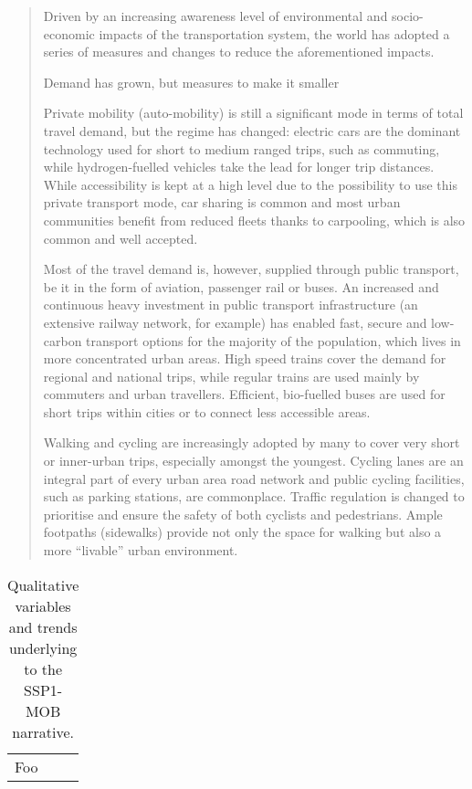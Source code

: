 \blockquote{Driven by an increasing awareness level of environmental and socio-economic impacts of the transportation system, the world has adopted a series of measures and changes to reduce the aforementioned impacts.

Demand has grown, but measures to make it smaller

Private mobility (auto-mobility) is still a significant mode in terms of total travel demand, but the regime has changed: electric cars are the dominant technology used for short to medium ranged trips, such as commuting, while hydrogen-fuelled vehicles take the lead for longer trip distances. While accessibility is kept at a high level due to the possibility to use this private transport mode, car sharing is common and most urban communities benefit from reduced fleets thanks to carpooling, which is also common and well accepted.

Most of the travel demand is, however, supplied through public transport, be it in the form of aviation, passenger rail or buses. An increased and continuous heavy investment in public transport infrastructure (an extensive railway network, for example) has enabled fast, secure and low-carbon transport options for the majority of the population, which lives in more concentrated urban areas. High speed trains cover the demand for regional and national trips, while regular trains are used mainly by commuters and urban travellers. Efficient, bio-fuelled buses are used for short trips within cities or to connect less accessible areas.

Walking and cycling are increasingly adopted by many to cover very short or inner-urban trips, especially amongst the youngest. Cycling lanes are an integral part of every urban area road network and public cycling facilities, such as parking stations, are commonplace. Traffic regulation is changed to prioritise and ensure the safety of both cyclists and pedestrians. Ample footpaths (sidewalks) provide not only the space for walking but also a more ``livable'' urban environment.

}


\begin{table}
\caption{Qualitative variables and trends underlying to the \gls{SSP1-MOB} narrative.}
\begin{tabular}{l}
Foo
\end{tabular}
\label{t:ssp1-mob-narrative-vars}
\end{table}